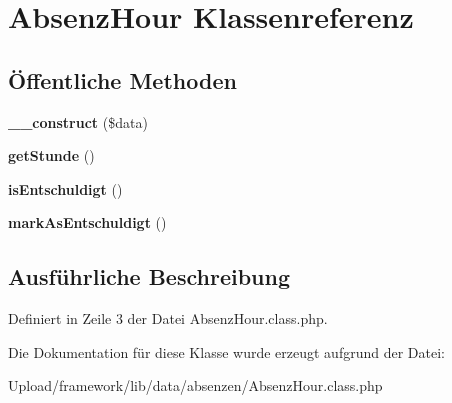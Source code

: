 \hypertarget{class_absenz_hour}{}\section{Absenz\+Hour Klassenreferenz}
\label{class_absenz_hour}
\subsection*{Öffentliche Methoden}
\begin{DoxyCompactItemize}
\item 
\mbox{\label{class_absenz_hour_a14feb47e5be46e66c89eda64d8606dee}} 
{\bfseries \+\_\+\+\_\+construct} (\$data)
\item 
\mbox{\label{class_absenz_hour_a3778951e1b039ea9f3c75bf70836a6ee}} 
{\bfseries get\+Stunde} ()
\item 
\mbox{\label{class_absenz_hour_a60fa5532dfe6d872ad3caa4c1c29d16a}} 
{\bfseries is\+Entschuldigt} ()
\item 
\mbox{\label{class_absenz_hour_a03fc352c60d97740b6eab38a5c89ab9c}} 
{\bfseries mark\+As\+Entschuldigt} ()
\end{DoxyCompactItemize}


\subsection{Ausführliche Beschreibung}


Definiert in Zeile 3 der Datei Absenz\+Hour.\+class.\+php.



Die Dokumentation für diese Klasse wurde erzeugt aufgrund der Datei\+:\begin{DoxyCompactItemize}
\item 
Upload/framework/lib/data/absenzen/Absenz\+Hour.\+class.\+php\end{DoxyCompactItemize}
